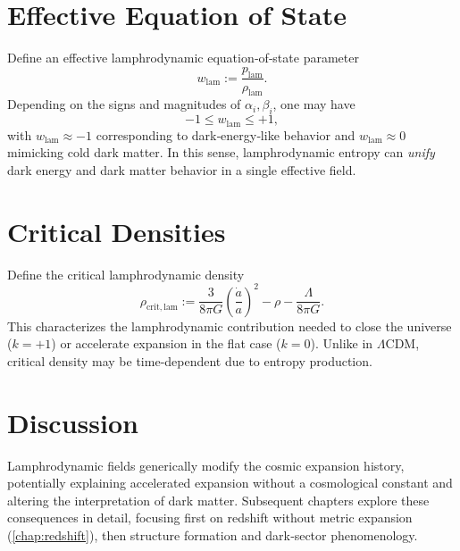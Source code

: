 \section{Effective Equation of State}

Define an effective lamphrodynamic equation‐of‐state parameter
\[
  w_{\mathrm{lam}}
  := \frac{p_{\mathrm{lam}}}{\rho_{\mathrm{lam}}}.
\]
Depending on the signs and magnitudes of $\alpha_i,\beta_i$, one may have
\[
  -1 \le w_{\mathrm{lam}} \le +1,
\]
with $w_{\mathrm{lam}}\approx -1$ corresponding to dark‐energy‐like behavior
and $w_{\mathrm{lam}}\approx 0$ mimicking cold dark matter. In this sense,
lamphrodynamic entropy can \emph{unify} dark energy and dark matter behavior
in a single effective field.

\section{Critical Densities}

Define the critical lamphrodynamic density
\[
  \rho_{\mathrm{crit,lam}}
  := \frac{3}{8\pi G}\left(\frac{\dot{a}}{a}\right)^2
  - \rho - \frac{\Lambda}{8\pi G}.
\]
This characterizes the lamphrodynamic contribution needed to close the
universe ($k=+1$) or accelerate expansion in the flat case ($k=0$). Unlike
in $\Lambda$CDM, critical density may be time‐dependent due to entropy
production.

\section{Discussion}

Lamphrodynamic fields generically modify the cosmic expansion history,
potentially explaining accelerated expansion without a cosmological constant
and altering the interpretation of dark matter. Subsequent chapters explore
these consequences in detail, focusing first on redshift without metric
expansion (\cref{chap:redshift}), then structure formation and dark‐sector
phenomenology.

\clearpage

